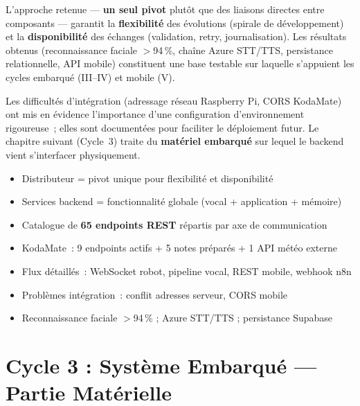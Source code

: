 \documentclass[a4paper,12pt]{report}
\begin{document}
	L'approche retenue --- \textbf{un seul pivot} plutôt que des liaisons directes
	entre composants --- garantit la \textbf{flexibilité} des évolutions (spirale de
	développement) et la \textbf{disponibilité} des échanges (validation, retry,
	journalisation). Les résultats obtenus (reconnaissance faciale $>$94\,\%, chaîne
	Azure STT/TTS, persistance relationnelle, API mobile) constituent une base
	testable sur laquelle s'appuient les cycles embarqué (III--IV) et mobile (V).
	
	Les difficultés d'intégration (adressage réseau Raspberry Pi, CORS KodaMate) ont
	mis en évidence l'importance d'une configuration d'environnement rigoureuse~;
	elles sont documentées pour faciliter le déploiement futur. Le chapitre suivant
	(Cycle~3) traite du \textbf{matériel embarqué} sur lequel le backend vient
	s'interfacer physiquement.
	
	\begin{tcolorbox}[colback=blue!5!white, colframe=blue!60!black,
		title=\textbf{Points clés du Cycle 2}]
		\begin{itemize}[noitemsep]
			\item Distributeur = pivot unique pour flexibilité et disponibilité
			\item Services backend = fonctionnalité globale (vocal + application + mémoire)
			\item Catalogue de \textbf{65 endpoints REST} répartis par axe de communication
			\item KodaMate~: 9 endpoints actifs + 5 notes préparés + 1 API météo externe
			\item Flux détaillés~: WebSocket robot, pipeline vocal, REST mobile, webhook n8n
			\item Problèmes intégration~: conflit adresses serveur, CORS mobile
			\item Reconnaissance faciale $>$94\,\% ; Azure STT/TTS ; persistance Supabase
		\end{itemize}
	\end{tcolorbox}

	\chapter{Cycle 3 : Système Embarqué --- Partie Matérielle}
	
\end{document}
